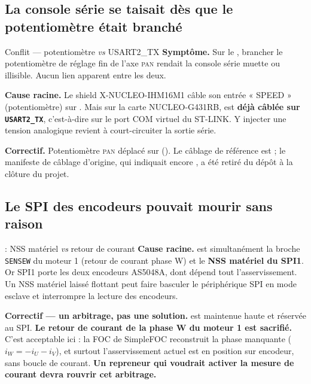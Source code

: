 \documentclass[11pt,a4paper]{article}
\begin{document}
\subsection{La console série se taisait dès que le potentiomètre était branché}

\begin{verroulevé}{Conflit  — potentiomètre \emph{vs} USART2\_TX}
\textbf{Symptôme.} Sur le , brancher le potentiomètre de réglage fin
de l'axe \textsc{pan} rendait la console série muette ou illisible. Aucun lien apparent
entre les deux.

\textbf{Cause racine.} Le shield X-NUCLEO-IHM16M1 câble son entrée « SPEED »
(potentiomètre) sur . Mais sur la carte NUCLEO-G431RB,  est
\textbf{déjà câblée sur \texttt{USART2\_TX}}, c'est-à-dire sur le port COM virtuel du
ST-LINK. Y injecter une tension analogique revient à court-circuiter la sortie série.

\textbf{Correctif.} Potentiomètre \textsc{pan} déplacé sur 
(). Le câblage de référence est  ;
le manifeste de câblage d'origine, qui indiquait encore , a été retiré du
dépôt à la clôture du projet.
\end{verroulevé}

\subsection{Le SPI des encodeurs pouvait mourir sans raison}

\begin{verroulevé}{ : NSS matériel \emph{vs} retour de courant}
\textbf{Cause racine.}  est simultanément la broche \texttt{SENSEW} du moteur 1
(retour de courant phase W) et le \textbf{NSS matériel du SPI1}. Or SPI1 porte les deux
encodeurs AS5048A, dont dépend tout l'asservissement. Un NSS matériel laissé flottant peut
faire basculer le périphérique SPI en mode esclave et interrompre la lecture des encodeurs.

\textbf{Correctif — un arbitrage, pas une solution.}  est maintenue haute et
réservée au SPI. \textbf{Le retour de courant de la phase W du moteur 1 est sacrifié.}
C'est acceptable ici : la FOC de SimpleFOC reconstruit la phase manquante
($i_W = -i_U - i_V$), et surtout l'asservissement actuel est en position sur encodeur, sans
boucle de courant. \textbf{Un repreneur qui voudrait activer la mesure de courant devra
rouvrir cet arbitrage.}
\end{verroulevé}
\end{document}
